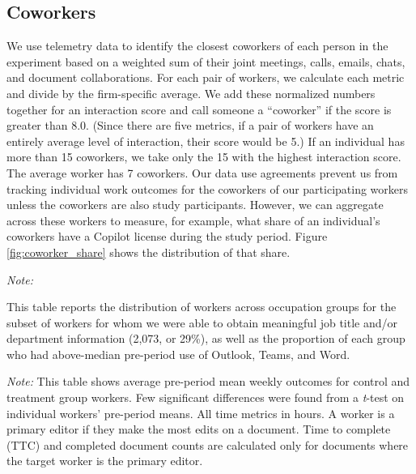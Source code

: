 \documentclass{article}
\newenvironment{tablenotes}{
    \begin{flushleft} \small
    \textit{Note:} 
}{
    \end{flushleft}
}
\begin{document}
\subsection{Coworkers \label{app:coworkers}}
We use telemetry data to identify the closest coworkers of each person in the experiment based on a weighted sum of their joint meetings, calls, emails, chats, and document collaborations. For each pair of workers, we calculate each metric and divide by the firm-specific average. We add these normalized numbers together for an interaction score and call someone a ``coworker'' if the score is greater than 8.0. (Since there are five metrics, if a pair of workers have an entirely average level of interaction, their score would be 5.) If an individual has more than 15 coworkers, we take only the 15 with the highest interaction score. The average worker has 7 coworkers. Our data use agreements prevent us from tracking individual work outcomes for the coworkers of our participating workers unless the coworkers are also study participants. However, we can aggregate across these workers to measure, for example, what share of an individual's coworkers have a Copilot license during the study period. Figure \ref{fig:coworker_share} shows the distribution of that share. 

\begin{table}[htbp]
    \caption{Occupational Classification and App Use}
    
    \begin{tablenotes}
        This table reports the distribution of workers across occupation groups for the subset of workers for whom we were able to obtain meaningful job title and/or department information (2,073, or 29\%), as well as the proportion of each group who had above-median pre-period use of Outlook, Teams, and Word.
    \end{tablenotes}
    \label{table:occupation_table}
\end{table}

\begin{table}[htbp]
    \caption{Pre-Period Balance Test} 
    
    \begin{tablenotes} This table shows average pre-period mean weekly outcomes for control and treatment group workers. Few significant differences were found from a \textit{t}-test on individual workers' pre-period means. All time metrics in hours. A worker is a primary editor if they make the most edits on a document. Time to complete (TTC) and completed document counts are calculated only for documents where the target worker is the primary editor.
    \end{tablenotes}
    
    \label{table:balance_table}
\end{table}
\end{document}
